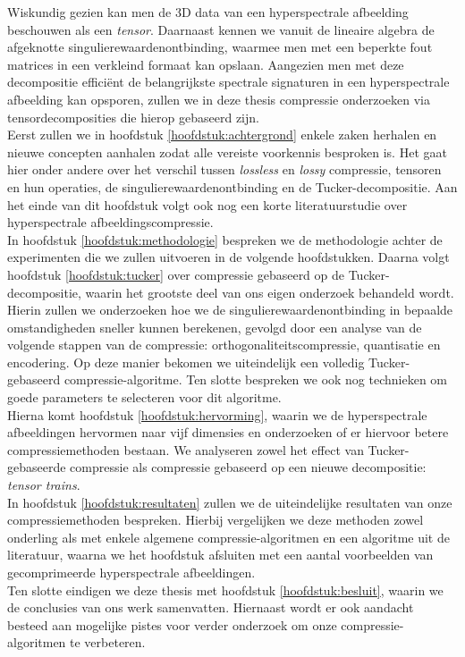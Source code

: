 Wiskundig gezien kan men de 3D data van een hyperspectrale afbeelding beschouwen als een \textit{tensor}. Daarnaast kennen we vanuit de lineaire algebra de afgeknotte singulierewaardenontbinding, waarmee men met een beperkte fout matrices in een verkleind formaat kan opslaan. Aangezien men met deze decompositie effici\"ent de belangrijkste spectrale signaturen in een hyperspectrale afbeelding kan opsporen, zullen we in deze thesis compressie onderzoeken via tensordecomposities die hierop gebaseerd zijn.\\

Eerst zullen we in hoofdstuk \ref{hoofdstuk:achtergrond} enkele zaken herhalen en nieuwe concepten aanhalen zodat alle vereiste voorkennis besproken is. Het gaat hier onder andere over het verschil tussen \textit{lossless} en \textit{lossy} compressie, tensoren en hun operaties, de singulierewaardenontbinding en de Tucker-decompositie. Aan het einde van dit hoofdstuk volgt ook nog een korte literatuurstudie over hyperspectrale afbeeldingscompressie.\\

In hoofdstuk \ref{hoofdstuk:methodologie} bespreken we de methodologie achter de experimenten die we zullen uitvoeren in de volgende hoofdstukken. Daarna volgt hoofdstuk \ref{hoofdstuk:tucker} over compressie gebaseerd op de Tucker-decompositie, waarin het grootste deel van ons eigen onderzoek behandeld wordt. Hierin zullen we onderzoeken hoe we de singulierewaardenontbinding in bepaalde omstandigheden sneller kunnen berekenen, gevolgd door een analyse van de volgende stappen van de compressie: orthogonaliteitscompressie, quantisatie en encodering. Op deze manier bekomen we uiteindelijk een volledig Tucker-gebaseerd compressie-algoritme. Ten slotte bespreken we ook nog technieken om goede parameters te selecteren voor dit algoritme.\\

Hierna komt hoofdstuk \ref{hoofdstuk:hervorming}, waarin we de hyperspectrale afbeeldingen hervormen naar vijf dimensies en onderzoeken of er hiervoor betere compressiemethoden bestaan. We analyseren zowel het effect van Tucker-gebaseerde compressie als compressie gebaseerd op een nieuwe decompositie: \textit{tensor trains}.\\

In hoofdstuk \ref{hoofdstuk:resultaten} zullen we de uiteindelijke resultaten van onze compressiemethoden bespreken. Hierbij vergelijken we deze methoden zowel onderling als met enkele algemene compressie-algoritmen en een algoritme uit de literatuur, waarna we het hoofdstuk afsluiten met een aantal voorbeelden van gecomprimeerde hyperspectrale afbeeldingen.\\

Ten slotte eindigen we deze thesis met hoofdstuk \ref{hoofdstuk:besluit}, waarin we de conclusies van ons werk samenvatten. Hiernaast wordt er ook aandacht besteed aan mogelijke pistes voor verder onderzoek om onze compressie-algoritmen te verbeteren.